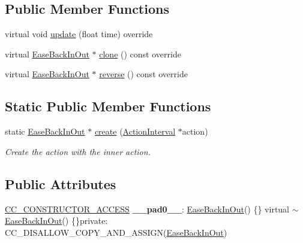 \subsection*{Public Member Functions}
\begin{DoxyCompactItemize}
\item 
virtual void \hyperlink{classEaseBackInOut_ae26d3104da166cedfd16ea1915069a4a}{update} (float time) override
\item 
virtual \hyperlink{classEaseBackInOut}{Ease\+Back\+In\+Out} $\ast$ \hyperlink{classEaseBackInOut_a30f30de6135349f2454843428d7777e3}{clone} () const override
\item 
virtual \hyperlink{classEaseBackInOut}{Ease\+Back\+In\+Out} $\ast$ \hyperlink{classEaseBackInOut_ab78f59eef3912ce006b0888eed4aac5c}{reverse} () const override
\end{DoxyCompactItemize}
\subsection*{Static Public Member Functions}
\begin{DoxyCompactItemize}
\item 
static \hyperlink{classEaseBackInOut}{Ease\+Back\+In\+Out} $\ast$ \hyperlink{classEaseBackInOut_a755d76abb67049a064cf4a5e7ffda9f0}{create} (\hyperlink{classActionInterval}{Action\+Interval} $\ast$action)
\begin{DoxyCompactList}\small\item\em Create the action with the inner action. \end{DoxyCompactList}\end{DoxyCompactItemize}
\subsection*{Public Attributes}
\begin{DoxyCompactItemize}
\item 
\mbox{\label{classEaseBackInOut_a9fdd5e5544235dfdbbb502e2531ada74}} 
\hyperlink{_2cocos2d_2cocos_2base_2ccConfig_8h_a25ef1314f97c35a2ed3d029b0ead6da0}{C\+C\+\_\+\+C\+O\+N\+S\+T\+R\+U\+C\+T\+O\+R\+\_\+\+A\+C\+C\+E\+SS} {\bfseries \+\_\+\+\_\+pad0\+\_\+\+\_\+}\+: \hyperlink{classEaseBackInOut}{Ease\+Back\+In\+Out}() \{\} virtual $\sim$\hyperlink{classEaseBackInOut}{Ease\+Back\+In\+Out}() \{\}private\+: C\+C\+\_\+\+D\+I\+S\+A\+L\+L\+O\+W\+\_\+\+C\+O\+P\+Y\+\_\+\+A\+N\+D\+\_\+\+A\+S\+S\+I\+GN(\hyperlink{classEaseBackInOut}{Ease\+Back\+In\+Out})
\end{DoxyCompactItemize}
